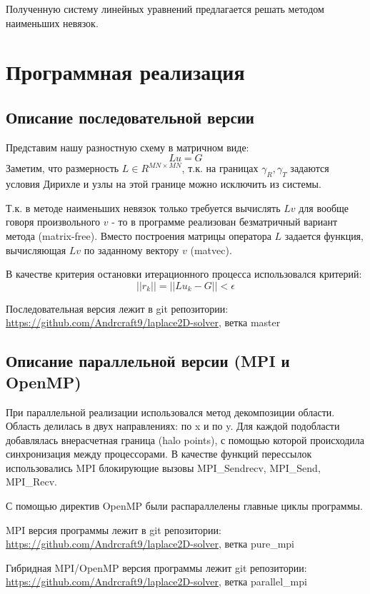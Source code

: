 \documentclass[12pt]{article}
\begin{document}
Полученную систему линейных уравнений предлагается решать методом наименьших невязок.

\newpage 

\section{Программная реализация}
\subsection{Описание последовательной версии}
Представим нашу разностную схему в матричном виде:
$$ L u = G $$
Заметим, что размерность $L \in R^{MN \times MN}$, т.к. на границах $\gamma_R, \gamma_T$ задаются условия Дирихле
и узлы на этой границе можно исключить из системы.

Т.к. в методе наименьших невязок только требуется вычислять $Lv$ для вообще говоря произвольного
$v$ - то в программе реализован безматричный вариант метода (matrix-free). 
Вместо построения матрицы оператора $L$ задается функция, вычисляющая $Lv$ по заданному вектору $v$ (matvec).

В качестве критерия остановки итерационного процесса использовался критерий: 
$$||r_k|| = ||Lu_k - G|| < \epsilon $$

Последовательная версия лежит в git репозитории: 
\url{https://github.com/Andrcraft9/laplace2D-solver}, ветка master

\subsection{Описание параллельной версии (MPI и OpenMP)}
При параллельной реализации использовался метод декомпозиции области.
Область делилась в двух направлениях: по x и по y.
Для каждой подобласти добавлялась внерасчетная граница (halo points), 
с помощью которой происходила синхронизация между процессорами.
В качестве функций перессылок использовались MPI блокирующие вызовы 
MPI\_Sendrecv, MPI\_Send, MPI\_Recv.

С помощью директив OpenMP были распараллелены главные циклы программы.

\bigskip

MPI версия программы лежит в git репозитории: 
\url{https://github.com/Andrcraft9/laplace2D-solver}, ветка pure\_mpi

Гибридная MPI/OpenMP версия программы лежит git репозитории: 
\url{https://github.com/Andrcraft9/laplace2D-solver}, ветка parallel\_mpi
\end{document}
